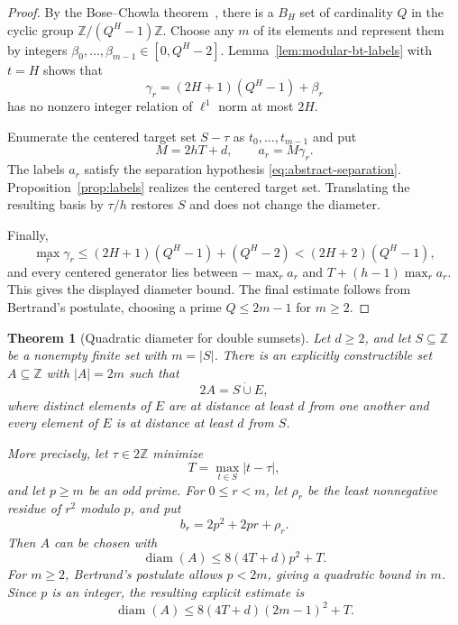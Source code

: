\documentclass[11pt]{article}
\newtheorem{theorem}{Theorem}
\newcommand{\Z}{\mathbb{Z}}
\begin{document}
\begin{proof}
By the Bose--Chowla theorem~\cite{BoseChowla}, there is a $B_H$ set of
cardinality $Q$ in the cyclic group $\Z/(Q^H-1)\Z$. Choose any $m$ of its
elements and represent them by integers
$\beta_0,\ldots,\beta_{m-1}\in[0,Q^H-2]$. Lemma~\ref{lem:modular-bt-labels}
with $t=H$ shows that
\[
 \gamma_r=(2H+1)(Q^H-1)+\beta_r
\]
has no nonzero integer relation of $\ell^1$ norm at most $2H$.

Enumerate the centered target set $S-\tau$ as $t_0,\ldots,t_{m-1}$ and put
\[
 M=2hT+d,
 \qquad
 a_r=M\gamma_r.
\]
The labels $a_r$ satisfy the separation hypothesis
\eqref{eq:abstract-separation}. Proposition~\ref{prop:labels} realizes the
centered target set. Translating the resulting basis by $\tau/h$ restores
$S$ and does not change the diameter.

Finally,
\[
 \max_r\gamma_r
 \leq (2H+1)(Q^H-1)+(Q^H-2)
 < (2H+2)(Q^H-1),
\]
and every centered generator lies between $-\max_r a_r$ and
$T+(h-1)\max_r a_r$. This gives the displayed diameter bound. The final
estimate follows from Bertrand's postulate, choosing a prime
$Q\leq 2m-1$ for $m\geq 2$.
\end{proof}

\begin{theorem}[Quadratic diameter for double sumsets]\label{thm:sidon}
Let $d\geq 2$, and let $S\subseteq\Z$ be a nonempty finite set with $m=|S|$.
There is an explicitly constructible set $A\subseteq\Z$ with $|A|=2m$ such
that
\[
 2A=S\mathbin{\dot\cup}E,
\]
where distinct elements of $E$ are at distance at least $d$ from one another
and every element of $E$ is at distance at least $d$ from $S$.

More precisely, let $\tau\in 2\Z$ minimize
\[
 T=\max_{t\in S}|t-\tau|,
\]
and let $p\geq m$ be an odd prime. For $0\leq r<m$, let $\rho_r$ be the least
nonnegative residue of $r^2$ modulo $p$, and put
\[
 b_r=2p^2+2pr+\rho_r.
\]
Then $A$ can be chosen with
\[
 \operatorname{diam}(A)\leq 8(4T+d)p^2+T.
\]
For $m\geq 2$, Bertrand's postulate allows $p<2m$, giving a quadratic bound
in $m$. Since $p$ is an integer, the resulting explicit estimate is
\[
 \operatorname{diam}(A)
 \leq 8(4T+d)(2m-1)^2+T.
\]
\end{theorem}
\end{document}
